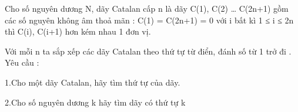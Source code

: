Cho số nguyên dương N, dãy Catalan cấp n là dãy C(1), C(2) … C(2n+1) gồm các số nguyên không âm thoả mãn : C(1) = C(2n+1) = 0 với i bất kì 1 ≤ i ≤ 2n thì C(i), C(i+1) hơn kém nhau 1 đơn vị.

Với mỗi n ta sắp xếp các dãy Catalan theo thứ tự từ điển, đánh số từ 1 trở đi . Yêu cầu :

1.Cho một dãy Catalan, hãy tìm thứ tự của dãy.

2.Cho số nguyên dương k hãy tìm dãy có thứ tự k

\